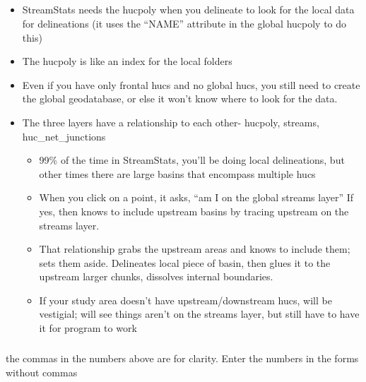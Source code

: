 \documentclass[letterpaper,10pt,english]{sphinxmanual}
\begin{document}
\subparagraph{}
\label{\detokenize{ex_2:introduction}}\begin{itemize}
\item {} 
StreamStats needs the hucpoly when you delineate to look for the local data for delineations (it uses the “NAME” attribute in the global hucpoly to do this)

\item {} 
The hucpoly is like an index for the local folders

\item {} 
Even if you have only frontal hucs and no global hucs, you still need to create the global geodatabase, or else it won’t know where to look for the data.

\item {} 
The three layers have a relationship to each other- hucpoly, streams, huc\_net\_junctions
\begin{itemize}
\item {} 
99\% of the time in StreamStats, you’ll be doing local delineations, but other times there are large basins that encompass multiple hucs

\item {} 
When you click on a point, it asks, “am I on the global streams layer” If yes, then knows to include upstream basins by tracing upstream on the streams layer.

\item {} 
That relationship grabs the upstream areas and knows to include them; sets them aside. Delineates local piece of basin, then glues it to the upstream larger chunks, dissolves internal boundaries.

\item {} 
If your study area doesn’t have upstream/downstream hucs, will be vestigial; will see things aren’t on the streams layer, but still have to have it for program to work

\end{itemize}

\end{itemize}


\subparagraph{}
\label{\detokenize{ex_2:streamstats-recommended-advanced-settings-and-thresholds}}
 the commas in the numbers above are for clarity. Enter the numbers in the forms without commas
\end{document}
